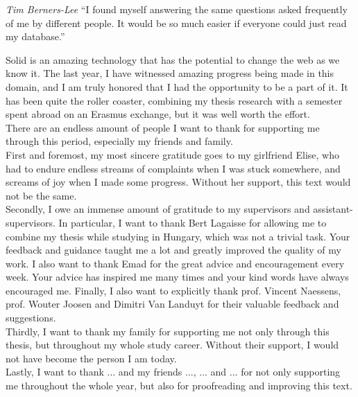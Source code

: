 \begin{preface}
\begin{fancyquote}{\textit{Tim Berners-Lee}}
``I found myself answering the same questions asked frequently of me by different people. It would be so much easier if everyone could just read my database.''
\end{fancyquote}

\noindent Solid is an amazing technology that has the potential to change the web as we know it. The last year, I have witnessed amazing progress being made in this domain, and I am truly honored that I had the opportunity to be a part of it. It has been quite the roller coaster, combining my thesis research with a semester spent abroad on an Erasmus exchange, but it was well worth the effort.\\

\noindent There are an endless amount of people I want to thank for supporting me through this period, especially my friends and family.\\

\noindent First and foremost, my most sincere gratitude goes to my girlfriend Elise, who had to endure endless streams of complaints when I was stuck somewhere, and screams of joy when I made some progress. Without her support, this text would not be the same.\\

\noindent Secondly, I owe an immense amount of gratitude to my supervisors and assistant-supervisors. 
In particular, I want to thank Bert Lagaisse for allowing me to combine my thesis while studying in Hungary, which was not a trivial task. Your feedback and guidance taught me a lot and greatly improved the quality of my work. I also want to thank Emad for the great advice and encouragement every week. Your advice has inspired me many times and your kind words have always encouraged me. Finally, I also want to explicitly thank prof. Vincent Naessens, prof. Wouter Joosen and Dimitri Van Landuyt for their valuable feedback and suggestions.\\

\noindent Thirdly, I want to thank my family for supporting me not only through this thesis, but throughout my whole study career. Without their support, I would not have become the person I am today.\\

\noindent Lastly, I want to thank ... and my friends ..., ... and ... for not only supporting me throughout the whole year, but also for proofreading and improving this text. 

\end{preface}